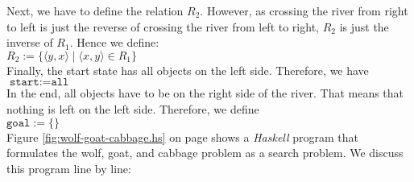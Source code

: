 Next, we have to define the relation $R_2$.  However, as crossing the river from right to left
is just the reverse of crossing the river from left to right, $R_2$ is just the inverse of
$R_1$.   Hence we define:
\\[0.2cm]
\hspace*{1.3cm}
$R_2  := \bigl\{ \langle y, x \rangle \mid \langle x, y \rangle \in R_1 \bigr\}$
\\[0.2cm]
Finally, the start state has all objects on the left side.  Therefore, we have
\\[0.2cm]
\hspace*{1.3cm}
$\texttt{start} := \texttt{all}$
\\[0.2cm]
In the end, all objects have to be on the right side of the river.  That means that nothing is left
on the left side.  Therefore, we define
\\[0.2cm]
\hspace*{1.3cm}
$\texttt{goal} := \{\}$
\\[0.2cm]
Figure \ref{fig:wolf-goat-cabbage.hs} on page \pageref{fig:wolf-goat-cabbage.hs} shows a \textsl{Haskell} program that 
formulates the wolf, goat, and cabbage problem as a search problem.
We discuss this program line by line:

